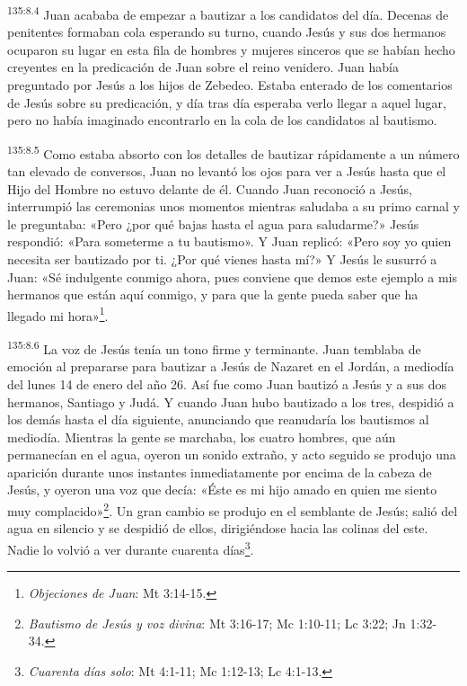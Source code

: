 \par
\textsuperscript{135:8.4} Juan acababa de empezar a bautizar a los candidatos del día. Decenas de penitentes formaban cola esperando su turno, cuando Jesús y sus dos hermanos ocuparon su lugar en esta fila de hombres y mujeres sinceros que se habían hecho creyentes en la predicación de Juan sobre el reino venidero. Juan había preguntado por Jesús a los hijos de Zebedeo. Estaba enterado de los comentarios de Jesús sobre su predicación, y día tras día esperaba verlo llegar a aquel lugar, pero no había imaginado encontrarlo en la cola de los candidatos al bautismo.

\par
\textsuperscript{135:8.5} Como estaba absorto con los detalles de bautizar rápidamente a un número tan elevado de conversos, Juan no levantó los ojos para ver a Jesús hasta que el Hijo del Hombre no estuvo delante de él. Cuando Juan reconoció a Jesús, interrumpió las ceremonias unos momentos mientras saludaba a su primo carnal y le preguntaba: «Pero ¿por qué bajas hasta el agua para saludarme?» Jesús respondió: «Para someterme a tu bautismo». Y Juan replicó: «Pero soy yo quien necesita ser bautizado por ti. ¿Por qué vienes hasta mí?» Y Jesús le susurró a Juan: «Sé indulgente conmigo ahora, pues conviene que demos este ejemplo a mis hermanos que están aquí conmigo, y para que la gente pueda saber que ha llegado mi hora»\footnote{\textit{Objeciones de Juan}: Mt 3:14-15.}.

\par
\textsuperscript{135:8.6} La voz de Jesús tenía un tono firme y terminante. Juan temblaba de emoción al prepararse para bautizar a Jesús de Nazaret en el Jordán, a mediodía del lunes 14 de enero del año 26. Así fue como Juan bautizó a Jesús y a sus dos hermanos, Santiago y Judá. Y cuando Juan hubo bautizado a los tres, despidió a los demás hasta el día siguiente, anunciando que reanudaría los bautismos al mediodía. Mientras la gente se marchaba, los cuatro hombres, que aún permanecían en el agua, oyeron un sonido extraño, y acto seguido se produjo una aparición durante unos instantes inmediatamente por encima de la cabeza de Jesús, y oyeron una voz que decía: «Éste es mi hijo amado en quien me siento muy complacido»\footnote{\textit{Bautismo de Jesús y voz divina}: Mt 3:16-17; Mc 1:10-11; Lc 3:22; Jn 1:32-34.}. Un gran cambio se produjo en el semblante de Jesús; salió del agua en silencio y se despidió de ellos, dirigiéndose hacia las colinas del este. Nadie lo volvió a ver durante cuarenta días\footnote{\textit{Cuarenta días solo}: Mt 4:1-11; Mc 1:12-13; Lc 4:1-13.}.

